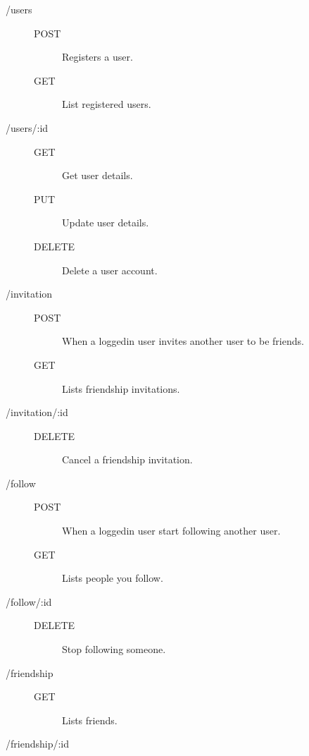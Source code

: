 \begin{description}
  \item [/users] \hfill
    \begin{description}
      \item [POST] Registers a user.
      \item [GET] List registered users.
    \end{description}
  \item [/users/:id] \hfill
    \begin{description}
      \item [GET] Get user details.
      \item [PUT] Update user details.
      \item [DELETE] Delete a user account.
    \end{description}
  \item [/invitation] \hfill
    \begin{description}
      \item [POST] When a loggedin user invites another user to be friends.
      \item [GET] Lists friendship invitations.
    \end{description}
  \item [/invitation/:id] \hfill
    \begin{description}
      \item [DELETE] Cancel a friendship invitation.
    \end{description}
  \item [/follow] \hfill
    \begin{description}
      \item [POST] When a loggedin user start following another user.
      \item [GET] Lists people you follow.
    \end{description}
  \item [/follow/:id] \hfill
    \begin{description}
      \item [DELETE] Stop following someone.
    \end{description}
  \item [/friendship] \hfill
    \begin{description}
      \item [GET] Lists friends.
    \end{description}
  \item [/friendship/:id] \hfill
    \begin{description}

\end{description}
\end{description}
